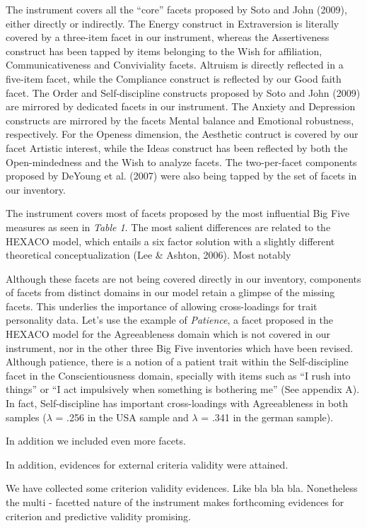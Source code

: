 \documentclass[,man,floatsintext]{apa6}
\theoremstyle{definition}
\theoremstyle{definition}
\theoremstyle{definition}
\theoremstyle{remark}
\begin{document}
The instrument covers all the \enquote{core} facets proposed by Soto and
John (2009), either directly or indirectly. The Energy construct in
Extraversion is literally covered by a three-item facet in our
instrument, whereas the Assertiveness construct has been tapped by items
belonging to the Wish for affiliation, Communicativeness and
Conviviality facets. Altruism is directly reflected in a five-item
facet, while the Compliance construct is reflected by our Good faith
facet. The Order and Self-discipline constructs proposed by Soto and
John (2009) are mirrored by dedicated facets in our instrument. The
Anxiety and Depression constructs are mirrored by the facets Mental
balance and Emotional robustness, respectively. For the Openess
dimension, the Aesthetic contruct is covered by our facet Artistic
interest, while the Ideas construct has been reflected by both the
Open-mindedness and the Wish to analyze facets. The two-per-facet
components proposed by DeYoung et al. (2007) were also being tapped by
the set of facets in our inventory.

The instrument covers most of facets proposed by the most influential
Big Five measures as seen in \emph{Table 1}. The most salient
differences are related to the HEXACO model, which entails a six factor
solution with a slightly different theoretical conceptualization (Lee \&
Ashton, 2006). Most notably

Although these facets are not being covered directly in our inventory,
components of facets from distinct domains in our model retain a glimpse
of the missing facets. This underlies the importance of allowing
cross-loadings for trait personality data. Let's use the example of
\emph{Patience}, a facet proposed in the HEXACO model for the
Agreeableness domain which is not covered in our instrument, nor in the
other three Big Five inventories which have been revised. Although
patience, there is a notion of a patient trait within the
Self-discipline facet in the Conscientiousness domain, specially with
items such as \enquote{I rush into things} or \enquote{I act impulsively
when something is bothering me} (See appendix A). In fact,
Self-discipline has important cross-loadings with Agreeableness in both
samples (\(\lambda\) = .256 in the USA sample and \(\lambda\) = .341 in
the german sample).

In addition we included even more facets.

In addition, evidences for external criteria validity were attained.

We have collected some criterion validity evidences. Like bla bla bla.
Nonetheless the multi - facetted nature of the instrument makes
forthcoming evidences for criterion and predictive validity promising.
\end{document}
